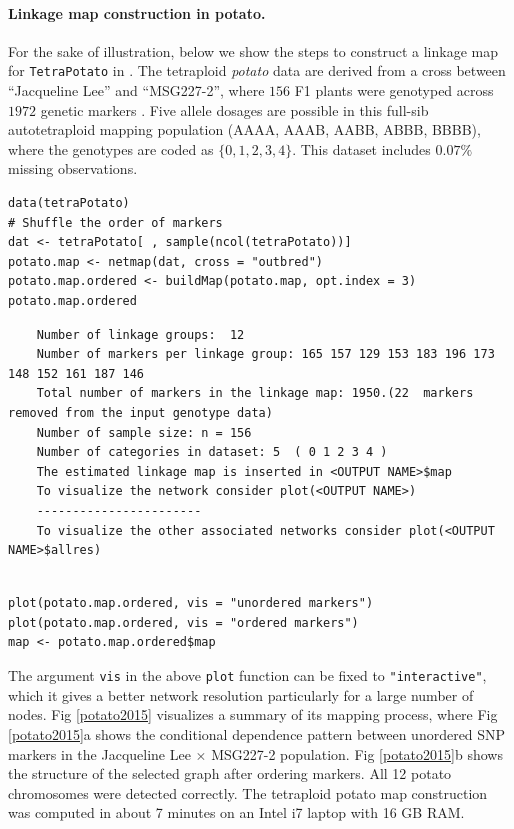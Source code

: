 \paragraph{Linkage map construction in potato.} For the sake of illustration, below we show the steps to construct a linkage map for {\tt TetraPotato} in . The tetraploid \emph{potato} data are derived from a cross between “Jacqueline Lee” and “MSG227-2”, where $156$ F1 plants were genotyped across $1972$ genetic markers \citep{massa2015genetic}. Five allele dosages are possible in this full-sib autotetraploid mapping population (AAAA, AAAB, AABB, ABBB, BBBB), where the genotypes are coded as $\{0, 1, 2, 3, 4\}$.  This dataset includes $0.07\%$ missing observations. 
\begin{verbatim}
data(tetraPotato)
# Shuffle the order of markers
dat <- tetraPotato[ , sample(ncol(tetraPotato))] 
potato.map <- netmap(dat, cross = "outbred")
potato.map.ordered <- buildMap(potato.map, opt.index = 3)
potato.map.ordered
\end{verbatim}
{\footnotesize
	\begin{verbatim}
	Number of linkage groups:  12 
	Number of markers per linkage group: 165 157 129 153 183 196 173 148 152 161 187 146 
	Total number of markers in the linkage map: 1950.(22  markers removed from the input genotype data)
	Number of sample size: n = 156 
	Number of categories in dataset: 5  ( 0 1 2 3 4 ) 
	The estimated linkage map is inserted in <OUTPUT NAME>$map 
	To visualize the network consider plot(<OUTPUT NAME>) 
	----------------------- 
	To visualize the other associated networks consider plot(<OUTPUT NAME>$allres) 
	\end{verbatim}
}
\begin{verbatim}

plot(potato.map.ordered, vis = "unordered markers") 
plot(potato.map.ordered, vis = "ordered markers") 
map <- potato.map.ordered$map
\end{verbatim}

The argument {\tt vis} in the above {\tt plot} function can be fixed to {\tt "interactive"}, which it gives a better network resolution particularly for a large number of nodes. Fig \ref{potato2015} visualizes a summary of its mapping process, where Fig \ref{potato2015}a shows the conditional dependence pattern between unordered SNP markers in the Jacqueline Lee $\times$ MSG227-2 population. Fig \ref{potato2015}b shows the structure of the selected graph after ordering markers. All 12 potato chromosomes were detected correctly. %
The tetraploid potato map construction was computed in about 7 minutes on an Intel i7 laptop with 16 GB RAM. %

